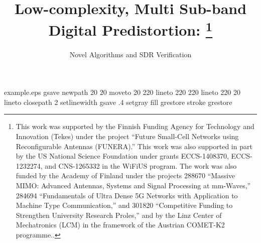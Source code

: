 %
%
%
%
%
\begin{filecontents*}{example.eps}
gsave
newpath
  20 20 moveto
  20 220 lineto
  220 220 lineto
  220 20 lineto
closepath
2 setlinewidth
gsave
  .4 setgray fill
grestore
stroke
grestore
\end{filecontents*}
%
\RequirePackage{fix-cm}
%
\documentclass[twocolumn]{svjour3}          %
%
\smartqed  %
%
\usepackage{amsmath,graphicx}
\usepackage{import}
\usepackage[ruled]{algorithm2e}
%
%
%
%
%


\title{Low-complexity, Multi Sub-band Digital Predistortion:
		\thanks{This work was supported by the Finnish Funding Agency for Technology
		and Innovation (Tekes) under the project “Future Small-Cell Networks using
		Reconfigurable Antennas (FUNERA).” This work was also supported in part
		by the US National Science Foundation under grants ECCS-1408370, ECCS-
		1232274, and CNS-1265332 in the WiFiUS program. The work was also
		funded by the Academy of Finland under the projects 288670 “Massive MIMO:
		Advanced Antennas, Systems and Signal Processing at mm-Waves,” 284694
		“Fundamentals of Ultra Dense 5G Networks with Application to Machine Type
		Communication,” and 301820 “Competitive Funding to Strengthen University
		Research Proles,” and by the Linz Center of Mechatronics (LCM) in the
		framework of the Austrian COMET-K2 programme..}
}
\subtitle{Novel Algorithms and SDR Verification}

